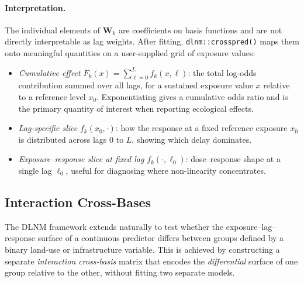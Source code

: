 \documentclass[12pt,a4paper]{article}
\begin{document}
\paragraph{Interpretation.}
The individual elements of $\mathbf{W}_k$ are coefficients on basis functions and are not directly interpretable as lag weights. After fitting, \texttt{dlnm::crosspred()} maps them onto meaningful quantities on a user-supplied grid of exposure values:
\begin{itemize}
  \item \emph{Cumulative effect} $F_k(x) = \sum_{\ell=0}^{L} f_k(x,\ell)$: the total log-odds contribution summed over all lags, for a sustained exposure value $x$ relative to a reference level $x_0$. Exponentiating gives a cumulative odds ratio and is the primary quantity of interest when reporting ecological effects.
  \item \emph{Lag-specific slice} $f_k(x_0, \cdot)$: how the response at a fixed reference exposure $x_0$ is distributed across lags $0$ to $L$, showing which delay dominates.
  \item \emph{Exposure--response slice at fixed lag} $f_k(\cdot, \ell_0)$: dose--response shape at a single lag $\ell_0$, useful for diagnosing where non-linearity concentrates.
\end{itemize}

\subsection{Interaction Cross-Bases}
\label{sec:interaction}

The DLNM framework extends naturally to test whether the exposure--lag--response surface of a continuous predictor differs between groups defined by a binary land-use or infrastructure variable. This is achieved by constructing a separate \emph{interaction cross-basis} matrix that encodes the \emph{differential} surface of one group relative to the other, without fitting two separate models.
\end{document}
